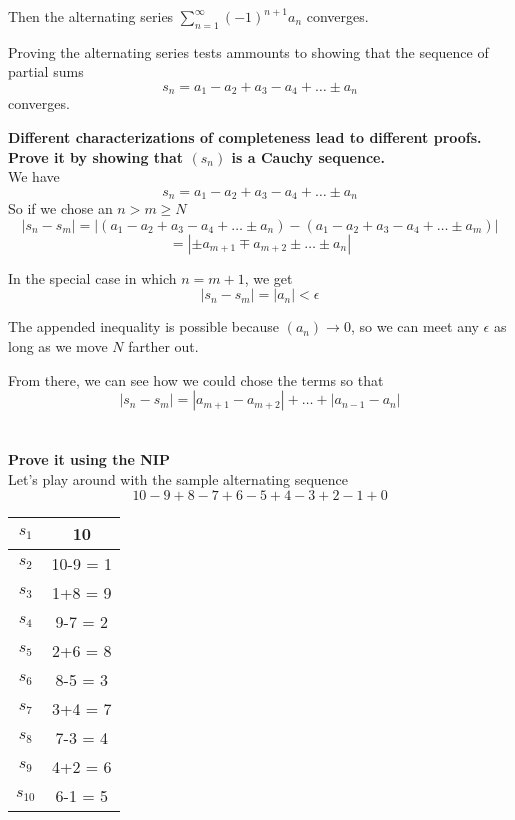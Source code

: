 Then the alternating series $\sum^{\infty}_{n=1} (-1)^{n+1} a_n$ converges.

Proving the alternating series tests ammounts to showing that the sequence of partial sums
$$
s_n = a_1 - a_2 + a_3 - a_4 + \ldots \pm a_n
$$
converges.

\textbf{Different characterizations of completeness lead to different proofs.}
\\

\textbf{Prove it by showing that $(s_n)$ is a Cauchy sequence.}
\\

We have
$$
s_n = a_1 - a_2 + a_3 - a_4 + \ldots \pm a_n
$$
So if we chose an $n > m \geq N$
$$
| s_n - s_m | = |(a_1 - a_2 + a_3 - a_4 + \ldots \pm a_n) - (a_1 - a_2 + a_3 - a_4 + \ldots \pm a_m)|
$$
$$
= | \pm a_{m+1} \mp a_{m+2} \pm \ldots \pm a_n |
$$

In the special case in which $n = m + 1$, we get
$$
| s_n - s_m | = | a_n | < \epsilon
$$

The appended inequality is possible because $(a_n) \rightarrow 0$, so we can meet any $\epsilon$
as long as we move $N$ farther out.

From there, we can see how we could chose the terms so that
$$
| s_n - s_m | = |a_{m+1} - a_{m+2}| + \ldots + |a_{n-1} - a_n|
$$
\\~\\


\textbf{Prove it using the NIP}
\\

Let's play around with the sample alternating sequence
$$
10 -9 +8 -7 +6 -5 +4 -3 +2 -1 +0
$$

\begin{center}
\begin{tabular}{ |c|c| }
    \hline
    $s_1$ & 10       \\ 
    \hline
    $s_2$ & 10-9 = 1 \\  
    \hline
    $s_3$ & 1+8 = 9  \\
    \hline
    $s_4$ & 9-7 = 2  \\
    \hline
    $s_5$ & 2+6 = 8  \\
    \hline
    $s_6$ & 8-5 = 3  \\
    \hline
    $s_7$ & 3+4 = 7  \\
    \hline
    $s_8$ & 7-3 = 4  \\
    \hline
    $s_9$ & 4+2 = 6  \\
    \hline
    $s_{10}$ & 6-1 = 5 \\
    \hline
\end{tabular}
\end{center}

